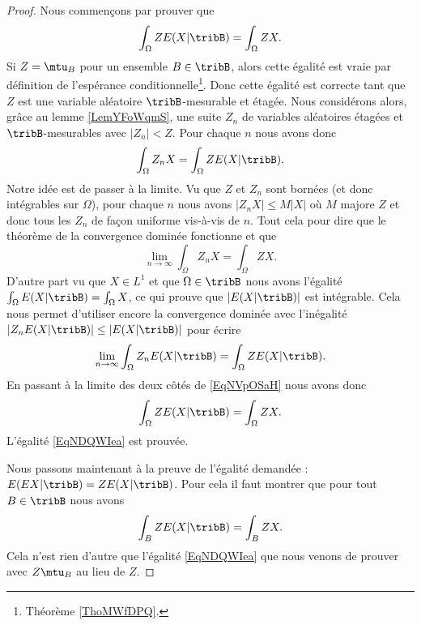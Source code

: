 \begin{proof}
    Nous commençons par prouver que 
    \begin{equation}    \label{EqNDQWIea}
        \int_{\Omega}ZE(X|\tribB)=\int_{\Omega}ZX.
    \end{equation}
    Si \( Z=\mtu_B\) pour un ensemble \( B\in\tribB\), alors cette égalité est vraie par définition de l'espérance conditionnelle\footnote{Théorème \ref{ThoMWfDPQ}.}. Donc cette égalité est correcte tant que \( Z\) est une variable aléatoire \( \tribB\)-mesurable et étagée. Nous considérons alors, grâce au lemme \ref{LemYFoWqmS}, une suite \( Z_n\) de variables aléatoires étagées et \( \tribB\)-mesurables avec \( | Z_n |<Z\). Pour chaque \( n\) nous avons donc
    \begin{equation}    \label{EqNVpOSaH}
        \int_{\Omega}Z_nX=\int_{\Omega}ZE(X|\tribB).
    \end{equation}
    Notre idée est de passer à la limite. Vu que \( Z\) et \( Z_n\) sont bornées (et donc intégrables sur \( \Omega\)), pour chaque \( n\) nous avons \( | Z_nX |\leq M| X |\) où \( M\) majore \( Z\) et donc tous les \( Z_n\) de façon uniforme vis-à-vis de \( n\). Tout cela pour dire que le théorème de la convergence dominée fonctionne et que
    \begin{equation}
        \lim_{n\to \infty} \int_{\Omega}Z_nX=\int_{\Omega}ZX.
    \end{equation}
    D'autre part vu que \( X\in L^1\) et que \( \Omega\in\tribB\) nous avons l'égalité \( \int_{\Omega}E(X|\tribB)=\int_{\Omega}X\), ce qui prouve que \( | E(X|\tribB) | \) est intégrable. Cela nous permet d'utiliser encore la convergence dominée avec l'inégalité \( | Z_nE(X|\tribB) |\leq | E(X|\tribB) |\) pour écrire
    \begin{equation}
        \lim_{n\to \infty} \int_{\Omega}Z_nE(X|\tribB)=\int_{\Omega}ZE(X|\tribB).
    \end{equation}
    En passant à la limite des deux côtés de \eqref{EqNVpOSaH} nous avons donc
    \begin{equation}
        \int_{\Omega}ZE(X|\tribB)=\int_{\Omega}ZX.
    \end{equation}
    L'égalité \eqref{EqNDQWIea} est prouvée.

    Nous passons maintenant à la preuve de l'égalité demandée : \( E(EX|\tribB)=ZE(X|\tribB)\). Pour cela il faut montrer que pour tout \( B\in\tribB\) nous avons
    \begin{equation}
        \int_{B}ZE(X|\tribB)=\int_BZX.
    \end{equation}
    Cela n'est rien d'autre que l'égalité \eqref{EqNDQWIea} que nous venons de prouver avec \( Z\mtu_{B}\) au lieu de \( Z\).
\end{proof}

